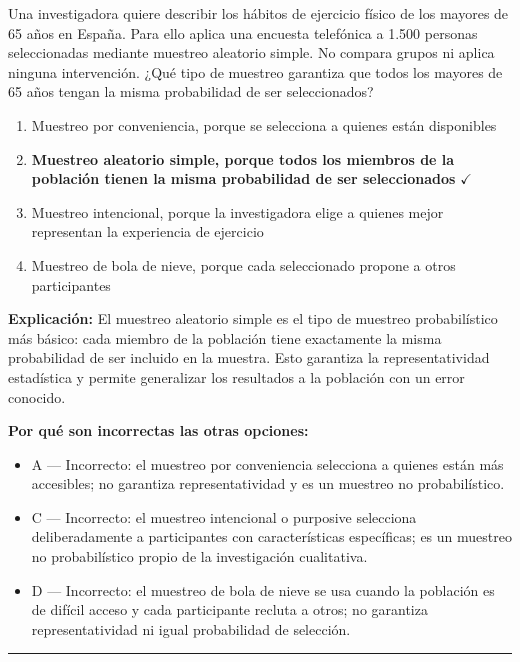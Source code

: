\documentclass[12pt,a4paper]{article}
\begin{document}
Una investigadora quiere describir los hábitos de ejercicio físico de los mayores de 65 años en España. Para ello aplica una encuesta telefónica a 1.500 personas seleccionadas mediante muestreo aleatorio simple. No compara grupos ni aplica ninguna intervención. ¿Qué tipo de muestreo garantiza que todos los mayores de 65 años tengan la misma probabilidad de ser seleccionados?

\begin{enumerate}
  \item[A.] Muestreo por conveniencia, porque se selecciona a quienes están disponibles
  \item[\textbf{\color{verde}B.}] \textbf{\color{verde} Muestreo aleatorio simple, porque todos los miembros de la población tienen la misma probabilidad de ser seleccionados} \hfill $\checkmark$
  \item[C.] Muestreo intencional, porque la investigadora elige a quienes mejor representan la experiencia de ejercicio
  \item[D.] Muestreo de bola de nieve, porque cada seleccionado propone a otros participantes
\end{enumerate}

\noindent\textbf{\color{azul}Explicación:} El muestreo aleatorio simple es el tipo de muestreo probabilístico más básico: cada miembro de la población tiene exactamente la misma probabilidad de ser incluido en la muestra. Esto garantiza la representatividad estadística y permite generalizar los resultados a la población con un error conocido.

\noindent\textbf{\color{gris}Por qué son incorrectas las otras opciones:}
\begin{itemize}
  \item {\small A — Incorrecto: el muestreo por conveniencia selecciona a quienes están más accesibles; no garantiza representatividad y es un muestreo no probabilístico.}
  \item {\small C — Incorrecto: el muestreo intencional o purposive selecciona deliberadamente a participantes con características específicas; es un muestreo no probabilístico propio de la investigación cualitativa.}
  \item {\small D — Incorrecto: el muestreo de bola de nieve se usa cuando la población es de difícil acceso y cada participante recluta a otros; no garantiza representatividad ni igual probabilidad de selección.}
\end{itemize}
\vspace{8pt}\hrule\vspace{10pt}
\end{document}
